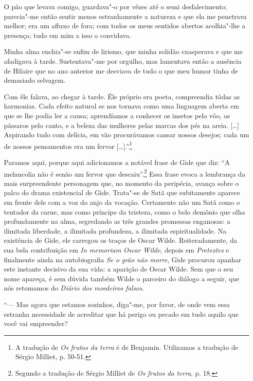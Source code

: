 O pão que levava comigo, guardava"-o por vêzes até o semi desfalecimento;
parecia"-me então sentir menos estranhamente a natureza e que ela me
penetrava melhor; era um afluxo de fora; com todos os meus sentidos
abertos acolhia"-lhe a presença; tudo em mim a isso o convidava.

Minha alma enchia"-se enfim de lirismo, que minha solidão exasperava e
que me afadigava à tarde. Sustentava"-me por orgulho, mas lamentava então
a ausência de Hilaire que no ano anterior me desviava de tudo o que meu
humor tinha de demasiado selvagem.

Com êle falava, ao chegar à tarde. Êle próprio era poeta, compreendia
tôdas as harmonias. Cada efeito natural se nos tornava como uma
linguagem aberta em que se lhe podia ler a causa; aprendíamos a conhecer
os insetos pelo vôo, os pássaros pelo canto, e a beleza das mulheres
pelas marcas dos pés na areia. {[}\ldots{}{]} Aspirando tudo com delícia, em
vão procurávamos cansar nossos desejos; cada um de nossos pensamentos
era um fervor {[}\ldots{}{]}.''\footnote{A tradução de \emph{Os frutos da
  terra} é de Benjamin. Utilizamos a tradução de Sérgio Milliet,
  p. 50-51. \versal{[N. T.]}}

Paramos aqui, porque aqui adicionamos a notável frase de Gide que diz:
``A melancolia não é senão um fervor que descaiu''.\footnote{Segundo a tradução de Sérgio Milliet de \emph{Os frutos da terra},
  p. 18. \versal{[N. T.]}} Essa frase evoca a lembrança da mais surpreendente personagem
que, no momento da peripécia, avança sobre o palco do drama existencial de
Gide. Trata"-se de Satã que subitamente aparece em frente dele com a voz do anjo da
vocação. Certamente não um Satã como o tentador da carne, mas
como príncipe da tristeza, como o belo demônio que olha profundamente na
alma, segredando as três grandes promessas enganosas: a ilimitada liberdade,
a ilimitada profundeza, a ilimitada espiritualidade.
Na existência de Gide, ele carregou os traços de Oscar Wilde. Reiteradamente,
da sua bela contribuição em \emph{In memoriam Oscar Wilde}, depois em
\emph{Pretextes} e finalmente ainda na autobiografia \emph{Se o grão não
morre}, Gide procurou apanhar este instante decisivo da sua vida: a
aparição de Oscar Wilde. Sem que o seu nome apareça, é sem dúvida também
Wilde o parceiro do diálogo a seguir, que nós retomamos do \emph{Diário
dos moedeiros falsos}.

``--- Mas agora que estamos sozinhos, diga"-me, por favor, de onde vem essa
estranha necessidade de acreditar que há perigo ou pecado em tudo aquilo
que você vai empreender?


